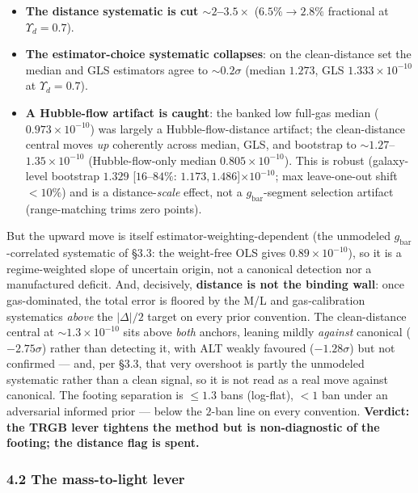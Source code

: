 \documentclass[
]{article}
\providecommand{\tightlist}{%
  \setlength{\itemsep}{0pt}\setlength{\parskip}{0pt}}
\begin{document}
\begin{itemize}
\tightlist
\item
  \textbf{The distance systematic is cut \(\sim2\)--\(3.5\times\)}
  (\(6.5\%\to2.8\%\) fractional at \(\Upsilon_d=0.7\)).
\item
  \textbf{The estimator-choice systematic collapses}: on the
  clean-distance set the median and GLS estimators agree to
  \(\sim0.2\sigma\) (median \(1.273\), GLS \(1.333\times10^{-10}\) at
  \(\Upsilon_d=0.7\)).
\item
  \textbf{A Hubble-flow artifact is caught}: the banked low full-gas
  median (\(0.973\times10^{-10}\)) was largely a Hubble-flow-distance
  artifact; the clean-distance central moves \emph{up} coherently across
  median, GLS, and bootstrap to \(\sim1.27\)--\(1.35\times10^{-10}\)
  (Hubble-flow-only median \(0.805\times10^{-10}\)). This is robust
  (galaxy-level bootstrap \(1.329\) {[}\(16\)--\(84\%\):
  \(1.173,1.486\){]}\(\times10^{-10}\); max leave-one-out shift
  \(<10\%\)) and is a distance-\emph{scale} effect, not a
  \(g_\mathrm{bar}\)-segment selection artifact (range-matching trims zero
  points).
\end{itemize}

But the upward move is itself estimator-weighting-dependent (the
unmodeled \(g_\mathrm{bar}\)-correlated systematic of §3.3: the weight-free
OLS gives \(0.89\times10^{-10}\)), so it is a regime-weighted slope of
uncertain origin, not a canonical detection nor a manufactured deficit.
And, decisively, \textbf{distance is not the binding wall}: once
gas-dominated, the total error is floored by the M/L and gas-calibration
systematics \emph{above} the \(|\Delta|/2\) target on every prior
convention. The clean-distance central at \(\sim1.3\times10^{-10}\) sits
above \emph{both} anchors, leaning mildly \emph{against} canonical
(\(-2.75\sigma\)) rather than detecting it, with ALT weakly favoured
(\(-1.28\sigma\)) but not confirmed --- and, per §3.3, that very
overshoot is partly the unmodeled systematic rather than a clean signal,
so it is not read as a real move against canonical. The footing
separation is \(\le1.3\) bans (log-flat), \(<1\) ban under an
adversarial informed prior --- below the \(2\)-ban line on every
convention. \textbf{Verdict: the TRGB lever tightens the method but is
non-diagnostic of the footing; the distance flag is spent.}

\subsubsection{4.2 The mass-to-light
lever}\label{the-mass-to-light-lever}
\end{document}
